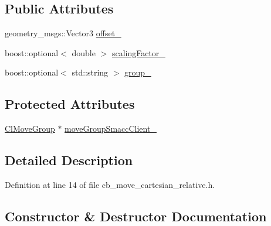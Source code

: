 \subsection*{Public Attributes}
\begin{DoxyCompactItemize}
\item 
geometry\+\_\+msgs\+::\+Vector3 \hyperlink{classmoveit__z__client_1_1CbMoveCartesianRelative_aa5316f2f734336722a353a8e9addea95}{offset\+\_\+}
\item 
boost\+::optional$<$ double $>$ \hyperlink{classmoveit__z__client_1_1CbMoveCartesianRelative_a0d483fda685fe6ef7e68240ae5b2140d}{scaling\+Factor\+\_\+}
\item 
boost\+::optional$<$ std\+::string $>$ \hyperlink{classmoveit__z__client_1_1CbMoveCartesianRelative_a45ff6b4ef0f48f75101f97fe1b5ff58d}{group\+\_\+}
\end{DoxyCompactItemize}
\subsection*{Protected Attributes}
\begin{DoxyCompactItemize}
\item 
\hyperlink{classmoveit__z__client_1_1ClMoveGroup}{Cl\+Move\+Group} $\ast$ \hyperlink{classmoveit__z__client_1_1CbMoveCartesianRelative_abe1a99706adf6cb61aacb034e0b6a4c9}{move\+Group\+Smacc\+Client\+\_\+}
\end{DoxyCompactItemize}


\subsection{Detailed Description}


Definition at line 14 of file cb\+\_\+move\+\_\+cartesian\+\_\+relative.\+h.



\subsection{Constructor \& Destructor Documentation}
\mbox{\label{classmoveit__z__client_1_1CbMoveCartesianRelative_a5c8cc24c13c1b440cd3ee7cdb26ec7e2}} 
